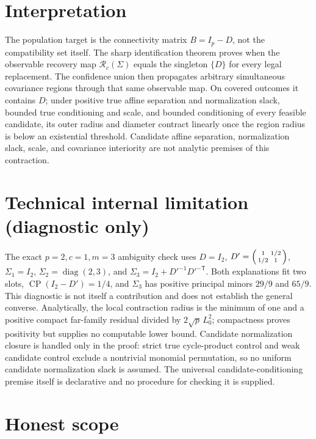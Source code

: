 \documentclass{article}
\begin{document}
\section{Interpretation}

The population target is the connectivity matrix \(B=I_p-D\), not the compatibility set itself. The sharp identification theorem proves when the observable recovery map \(\mathcal R_c(\Sigma)\) equals the singleton \(\{D\}\) for every legal replacement. The confidence union then propagates arbitrary simultaneous covariance regions through that same observable map. On covered outcomes it contains \(D\); under positive true affine separation and normalization slack, bounded true conditioning and scale, and bounded conditioning of every feasible candidate, its outer radius and diameter contract linearly once the region radius is below an existential threshold. Candidate affine separation, normalization slack, scale, and covariance interiority are not analytic premises of this contraction.

\section*{Technical internal limitation (diagnostic only)}

The exact \(p=2,c=1,m=3\) ambiguity check uses \(D=I_2\), \(D'=\begin{psmallmatrix}1&1/2\\1/2&1\end{psmallmatrix}\), \(\Sigma_1=I_2\), \(\Sigma_2=\operatorname{diag}(2,3)\), and \(\Sigma_3=I_2+D'^{-1}D'^{-\mathsf T}\). Both explanations fit two slots, \(\operatorname{CP}(I_2-D')=1/4\), and \(\Sigma_3\) has positive principal minors \(29/9\) and \(65/9\). This diagnostic is not itself a contribution and does not establish the general converse. Analytically, the local contraction radius is the minimum of one and a positive compact far-family residual divided by \(2\sqrt p\,L_0^2\); compactness proves positivity but supplies no computable lower bound. Candidate normalization closure is handled only in the proof: strict true cycle-product control and weak candidate control exclude a nontrivial monomial permutation, so no uniform candidate normalization slack is assumed. The universal candidate-conditioning premise itself is declarative and no procedure for checking it is supplied.

\section{Honest scope}
\end{document}
